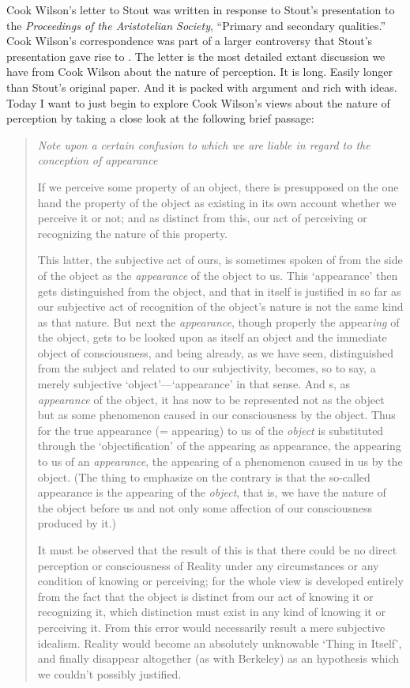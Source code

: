 \documentclass[12pt]{article}
\begin{document}
Cook Wilson's letter to Stout was written in response to Stout's \citeyearpar{Stout:1903zl} presentation to the \emph{Proceedings of the Aristotelian Society}, ``Primary and secondary qualities.'' Cook Wilson's correspondence was part of a larger controversy that Stout's presentation gave rise to \citep[see][for how this debate played out in Edwardian philosophy]{Nassim:2008fk}. The letter is the most detailed extant discussion we have from Cook Wilson about the nature of perception. It is long. Easily longer than Stout's original paper. And it is packed with argument and rich with ideas. Today I want to just begin to explore Cook Wilson's views about the nature of perception by taking a close look at the following brief passage:
\begin{quotation}
	\noindent \emph{Note upon a certain confusion to which we are liable in regard to the conception of appearance}
	
	If we perceive some property of an object, there is presupposed on the one hand the property of the object as existing in its own account whether we perceive it or not; and as distinct from this, our act of perceiving or recognizing the nature of this property.
	
	This latter, the subjective act of ours, is sometimes spoken of from the side of the object as the \emph{appearance} of the object to us. This `appearance' then gets distinguished from the object, and that in itself is justified in so far as our subjective act of recognition of the object's nature is not the same kind as that nature. But next the \emph{appearance}, though properly the appear\emph{ing} of the object, gets to be looked upon as itself an object and the immediate object of consciousness, and being already, as we have seen, distinguished from the subject and related to our subjectivity, becomes, so to say, a merely subjective `object'---`appearance' in that sense. And s, as \emph{appearance} of the object, it has now to be represented not as the object but as some phenomenon caused in our consciousness by the object. Thus for the true appearance (= appearing) to us of the \emph{object} is substituted through the `objectification' of the appearing as appearance, the appearing to us of an \emph{appearance}, the appearing of a phenomenon caused in us by the object. (The thing to emphasize on the contrary is that the so-called appearance is the appearing of the \emph{object}, that is, we have the nature of the object before us and not only some affection of our consciousness produced by it.)

	It must be observed that the result of this is that there could be no direct perception or consciousness of Reality under any circumstances or any condition of knowing or perceiving; for the whole view is developed entirely from the fact that the object is distinct from our act of knowing it or recognizing it, which distinction must exist in any kind of knowing it or perceiving it. From this error would necessarily result a mere subjective idealism. Reality would become an absolutely unknowable `Thing in Itself', and finally disappear altogether (as with Berkeley) as an hypothesis which we couldn't possibly justified. \citep[796-797]{Cook-Wilson:1926sf}
\end{quotation}
\end{document}
